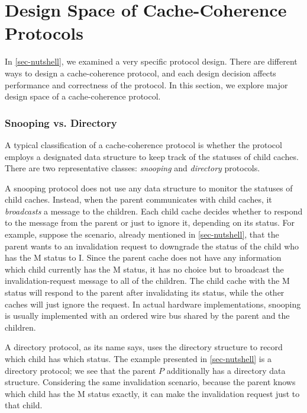 \section{Design Space of Cache-Coherence Protocols}
\label{sec-design-space}

In \autoref{sec-nutshell}, we examined a very specific protocol design.
There are different ways to design a cache-coherence protocol, and each design decision affects performance and correctness of the protocol.
In this section, we explore major design space of a cache-coherence protocol.

\subsubsection{Snooping vs. Directory}

A typical classification of a cache-coherence protocol is whether the protocol employs a designated data structure to keep track of the statuses of child caches.
There are two representative classes: \emph{snooping} and \emph{directory} protocols.

A snooping protocol does not use any data structure to monitor the statuses of child caches.
Instead, when the parent communicates with child caches, it \emph{broadcasts} a message to the children.
Each child cache decides whether to respond to the message from the parent or just to ignore it, depending on its status.
For example, suppose the scenario, already mentioned in \autoref{sec-nutshell}, that the parent wants to an invalidation request to downgrade the status of the child who has the M status to I.
Since the parent cache does not have any information which child currently has the M status, it has no choice but to broadcast the invalidation-request message to all of the children.
The child cache with the M status will respond to the parent after invalidating its status, while the other caches will just ignore the request.
In actual hardware implementations, snooping is usually implemented with an ordered wire bus shared by the parent and the children.

A directory protocol, as its name says, uses the directory structure to record which child has which status.
The example presented in \autoref{sec-nutshell} is a directory protocol; we see that the parent $P$ additionally has a directory data structure.
Considering the same invalidation scenario, because the parent knows which child has the M status exactly, it can make the invalidation request just to that child.

